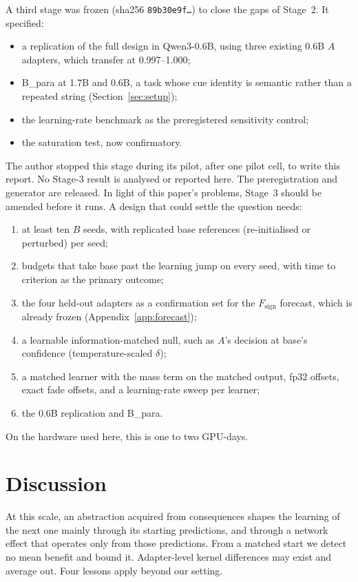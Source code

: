 \documentclass[11pt]{article}
\begin{document}
A third stage was frozen (sha256 \texttt{89b30e9f\ldots}) to close the gaps of Stage~2. It specified:
\begin{itemize}
\item a replication of the full design in Qwen3-0.6B, using three existing 0.6B $A$ adapters, which transfer at 0.997--1.000;
\item B\_para at 1.7B and 0.6B, a task whose cue identity is semantic rather than a repeated string (Section~\ref{sec:setup});
\item the learning-rate benchmark as the preregistered sensitivity control;
\item the saturation test, now confirmatory.
\end{itemize}
The author stopped this stage during its pilot, after one pilot cell, to write this report. No Stage-3 result is analysed or reported here. The preregistration and generator are released. In light of this paper's problems, Stage~3 should be amended before it runs. A design that could settle the question needs:
\begin{enumerate}
\item at least ten $B$ seeds, with replicated base references (re-initialised or perturbed) per seed;
\item budgets that take base past the learning jump on every seed, with time to criterion as the primary outcome;
\item the four held-out adapters as a confirmation set for the $F_{\text{sign}}$ forecast, which is already frozen (Appendix~\ref{app:forecast});
\item a learnable information-matched null, such as $A$'s decision at base's confidence (temperature-scaled $\delta$);
\item a matched learner with the mass term on the matched output, fp32 offsets, exact fade offsets, and a learning-rate sweep per learner;
\item the 0.6B replication and B\_para.
\end{enumerate}
On the hardware used here, this is one to two GPU-days.

\section{Discussion}

At this scale, an abstraction acquired from consequences shapes the learning of the next one mainly through its starting predictions, and through a network effect that operates only from those predictions. From a matched start we detect no mean benefit and bound it. Adapter-level kernel differences may exist and average out. Four lessons apply beyond our setting.
\end{document}
